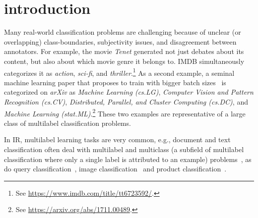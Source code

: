 
\section{introduction}
\label{sec:org662677c}


Many real-world classification problems are challenging because of unclear (or overlapping) class-boundaries, subjectivity issues, and disagreement between annotators.
For example, the movie \textit{Tenet} generated not just debates about its content, but also about which movie genre it belongs to. IMDB simultaneously categorizes it as \textit{action}, \textit{sci-fi}, and \textit{thriller}.\footnote{See \url{https://www.imdb.com/title/tt6723592/}.}
As a second example, a seminal machine learning paper that proposes to train with bigger batch sizes~\citep{bigBSArxiv} is categorized on \textit{arXiv} as \textit{Machine Learning (cs.LG)},
\textit{Computer Vision and Pattern Recognition (cs.CV)}, \textit{Distributed,
Parallel, and Cluster Computing (cs.DC)}, and \textit{Machine Learning
(stat.ML)}.\footnote{See \url{https://arxiv.org/abs/1711.00489}.}
These two examples are representative of a large class of multilabel classification problems.
%
\begin{comment}
\begin{enumerate}[label=(\arabic*),leftmargin=*]
\item The possibility of assigning more than one label to a single instance is desirable (i.e., labels are not mutually exclusive).
\item The instance being labeled needs to be inspected or consumed in its entirety before a full set of class labels can be determined. For example, it requires an entire viewing of the movie \textit{Tenet} to determine if the label \textit{romance} is appropriate, as it is arguably the underlying driver of the protagonists.
\item The number of labels differs per instance, making the number of labels to assign at inference time unknown.
\end{enumerate}
\end{comment}
%
In \ac{IR}, multilabel learning tasks are very common, e.g., document and text classification often deal with multilabel and multiclass (a subfield of multilabel classification where only a single label is attributed to an example) problems~\cite{IRClassStat, textCategorization, statTextCategorization, documentClassification}, as do query classification~\cite{queryClassification, introIR}, image classification~\cite{imageClassification, faceDetection} and product classification~\cite{Amoualian2020SIGIR2E}. 


